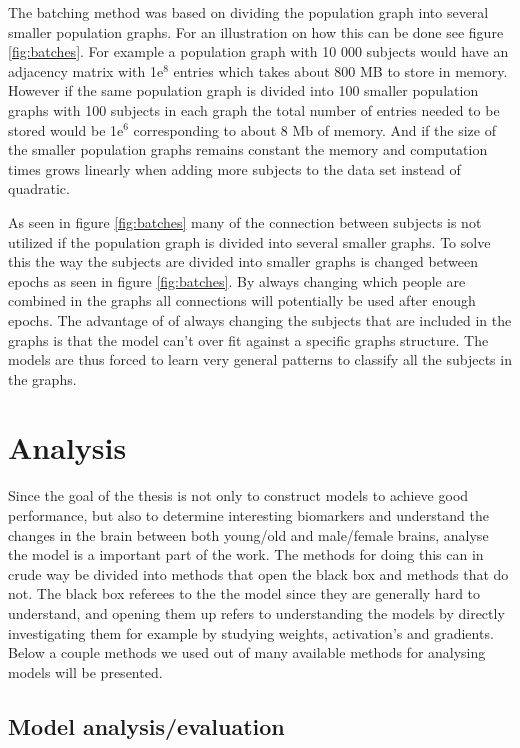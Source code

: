 The batching method was based on dividing the population graph into several smaller population graphs. For an illustration on how this can be done see figure \ref{fig:batches}. For example a population graph with 10 000 subjects would have an adjacency matrix with 1e$^8$ entries which takes about 800 MB to store in memory. However if the same population graph is divided into 100 smaller population graphs with 100 subjects in each graph the total number of entries needed to be stored would be 1e$^6$ corresponding to about 8 Mb of memory. And if the size of the smaller population graphs remains constant the memory and computation times grows linearly when adding more subjects to the data set instead of quadratic.

As seen in figure \ref{fig:batches} many of the connection between subjects is not utilized if the population graph is divided into several smaller graphs. To solve this the way the subjects are divided into smaller graphs is changed between epochs as seen in figure \ref{fig:batches}. By always changing which people are combined in the graphs all connections will potentially be used after enough epochs. The advantage of of always changing the subjects that are included in the graphs is that the model can't over fit against a specific graphs structure. The models are thus forced to learn very general patterns to classify all the subjects in the graphs. 




\section{Analysis}
Since the goal of the thesis is not only to construct models to achieve good performance, but also to determine interesting biomarkers and understand the changes in the brain between both young/old and male/female brains, analyse the model is a important part of the work. The methods for doing this can in crude way be divided into methods that open the black box and methods that do not. The black box referees to the the model since they are generally hard to understand, and opening them up refers to understanding the models by directly investigating them for example by studying weights, activation's and gradients. Below a couple methods we used out of many available methods for analysing models will be presented. 


\subsection{Model analysis/evaluation}
